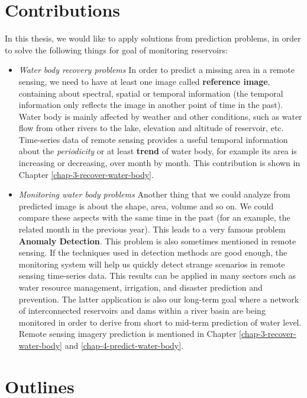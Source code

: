 \section{Contributions} %

In this thesis, we would like to apply solutions from prediction problems, in order to solve the following things for goal of monitoring reservoirs:
    
\begin{itemize}
	\item \textit{Water body recovery problems} In order to predict a missing area in a remote sensing, we need to have at least one image called \textbf{reference image}, containing about spectral, spatial or temporal information  (the temporal information only reflects the image in another point of time in the past). Water body is mainly affected by weather and other conditions, such as water flow from other rivers to the lake, elevation and altitude of reservoir, etc. Time-series data of remote sensing provides a useful temporal information about the \textit{periodicity} or at least \textbf{trend} of water body, for example its area is increasing or decreasing, over month by month. This contribution is shown in Chapter \ref{chap-3-recover-water-body}.

	\item \textit{Monitoring water body problems} Another thing that we could analyze from predicted image is about the shape, area, volume and so on. We could compare these aspects with the same time in the past (for an example, the related month in the previous year). This leads to a very famous problem \textbf{Anomaly Detection}. This problem is also sometimes mentioned in remote sensing\cite{Grosklos2015,Yang2019}. If the techniques used in detection methods are good enough, the monitoring system will help us quickly detect strange scenarios in remote sensing time-series data. This results can be applied in many sectors such as water resource management, irrigation, and disaster prediction and prevention. The latter application is also our long-term goal where a network of interconnected reservoirs and dams  within a river basin are being monitored in order to derive from short to mid-term prediction of water level. Remote sensing imagery prediction is mentioned in Chapter \ref{chap-3-recover-water-body} and \ref{chap-4-predict-water-body}.
\end{itemize}

\section{Outlines} 

